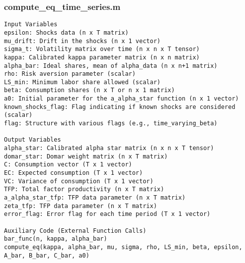 \documentclass[11pt]{article}
\theoremstyle{definition}
\newcommand{\codepath}{F:/12004835/replication_package_final/replication_package_final}
\begin{document}
	
	
	\subsubsection{compute\_eq\_time\_series.m}
	\begin{lstlisting}[style=Matlab]
Input Variables
epsilon: Shocks data (n x T matrix)
mu_drift: Drift in the shocks (n x 1 vector)
sigma_t: Volatility matrix over time (n x n x T tensor)
kappa: Calibrated kappa parameter matrix (n x n matrix)
alpha_bar: Ideal shares, mean of alpha_data (n x n+1 matrix)
rho: Risk aversion parameter (scalar)
LS_min: Minimum labor share allowed (scalar)
beta: Consumption shares (n x T or n x 1 matrix)
a0: Initial parameter for the a_alpha_star function (n x 1 vector)
known_shocks_flag: Flag indicating if known shocks are considered (scalar)
flag: Structure with various flags (e.g., time_varying_beta)

Output Variables
alpha_star: Calibrated alpha star matrix (n x n x T tensor)
domar_star: Domar weight matrix (n x T matrix)
C: Consumption vector (T x 1 vector)
EC: Expected consumption (T x 1 vector)
VC: Variance of consumption (T x 1 vector)
TFP: Total factor productivity (n x T matrix)
a_alpha_star_tfp: TFP data parameter (n x T matrix)
zeta_tfp: TFP data parameter (n x T matrix)
error_flag: Error flag for each time period (T x 1 vector)

Auxiliary Code (External Function Calls)
bar_func(n, kappa, alpha_bar)
compute_eq(kappa, alpha_bar, mu, sigma, rho, LS_min, beta, epsilon, A_bar, B_bar, C_bar, a0)
	\end{lstlisting}
	
	
	
	
	
\end{document}
